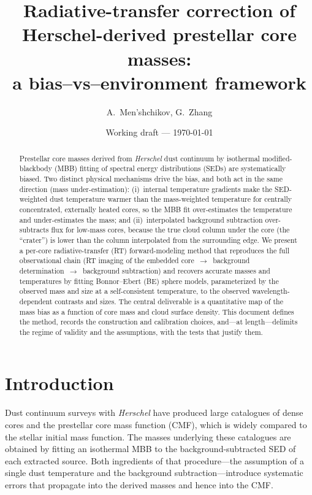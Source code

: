 \documentclass[11pt,a4paper]{article}
\title{\bfseries Radiative-transfer correction of Herschel-derived
prestellar core masses:\\ a bias--vs--environment framework}
\author{A.\ Men'shchikov, G.\ Zhang \draftnote{author list/order TBD}}
\date{Working draft --- \today}
\begin{document}
\maketitle

\begin{abstract}
\noindent
Prestellar core masses derived from \emph{Herschel} dust continuum by
isothermal modified-blackbody (MBB) fitting of spectral energy
distributions (SEDs) are systematically biased. Two distinct physical
mechanisms drive the bias, and both act in the same direction
(mass under-estimation): (i)~internal temperature gradients make the
SED-weighted dust temperature warmer than the mass-weighted temperature
for centrally concentrated, externally heated cores, so the MBB fit
over-estimates the temperature and under-estimates the mass; and
(ii)~interpolated background subtraction over-subtracts flux for low-mass
cores, because the true cloud column under the core (the ``crater'')
is lower than the column interpolated from the surrounding edge.
We present a per-core radiative-transfer (RT) forward-modeling method
that reproduces the full observational chain
(RT imaging of the embedded core~$\rightarrow$~background
determination~$\rightarrow$~background subtraction) and recovers accurate
masses and temperatures by fitting
Bonnor--Ebert (BE) sphere models, parameterized by the observed mass and
size at a self-consistent temperature, to the observed
wavelength-dependent contrasts and sizes. The central deliverable is a
quantitative map of the mass bias as a function of core mass and cloud
surface density. This document defines the method, records the
construction and calibration choices, and---at length---delimits the
regime of validity and the assumptions, with the tests that justify them.
\end{abstract}

\section{Introduction}

Dust continuum surveys with \emph{Herschel} have produced large catalogues
of dense cores and the prestellar core mass function (CMF), which is
widely compared to the stellar initial mass function. The masses underlying
these catalogues are obtained by fitting an isothermal MBB to the
background-subtracted SED of each extracted source. Both ingredients of
that procedure---the assumption of a single dust temperature and the
background subtraction---introduce systematic errors that propagate into
the derived masses and hence into the CMF.
\end{document}
